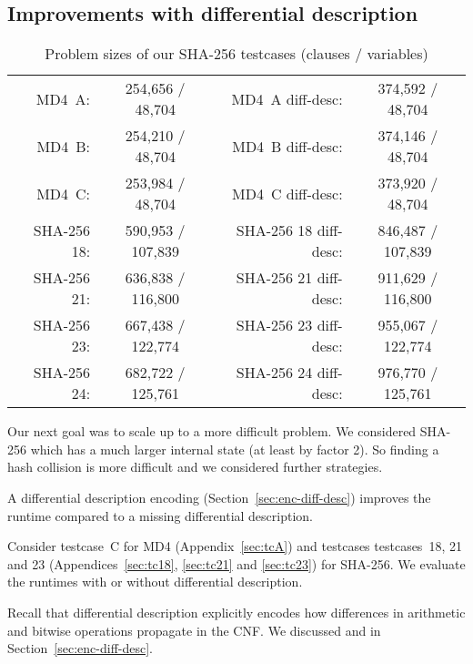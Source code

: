\subsection{Improvements with differential description}
\label{sec:result-diff-desc}
%
    \begin{table}[!h]
      \begin{center}
        \begin{tabular}{rc|rc}
          MD4~A: & 254,656 / 48,704 & MD4~A diff-desc: & 374,592 / 48,704 \\
          MD4~B: & 254,210 / 48,704 & MD4~B diff-desc: & 374,146 / 48,704 \\
          MD4~C: & 253,984 / 48,704 & MD4~C diff-desc: & 373,920 / 48,704 \\
          SHA-256 18: & 590,953 / 107,839 & SHA-256 18 diff-desc: & 846,487 / 107,839 \\
          SHA-256 21: & 636,838 / 116,800 & SHA-256 21 diff-desc: & 911,629 / 116,800 \\
          SHA-256 23: & 667,438 / 122,774 & SHA-256 23 diff-desc: & 955,067 / 122,774 \\
          SHA-256 24: & 682,722 / 125,761 & SHA-256 24 diff-desc: & 976,770 / 125,761
        \end{tabular}
        \caption{Problem sizes of our SHA-256 testcases (clauses / variables)}
        \label{tab:problem-sizes}
      \end{center}
    \end{table}
Our next goal was to scale up to a more difficult problem. We considered SHA-256
which has a much larger internal state (at least by factor 2). So finding a hash
collision is more difficult and we considered further strategies.

\begin{prop}
  A differential description encoding (Section~\ref{sec:enc-diff-desc})
  improves the runtime compared to a missing differential description.
\end{prop}

Consider testcase~C for MD4 (Appendix~\ref{sec:tcA}) and testcases
testcases~18, 21 and 23 (Appendices~\ref{sec:tc18}, \ref{sec:tc21} and
\ref{sec:tc23}) for SHA-256. We evaluate the
runtimes with or without differential description.

Recall that differential description explicitly encodes
how differences in arithmetic and bitwise operations propagate in the CNF.
We discussed  and  in Section~\ref{sec:enc-diff-desc}.

